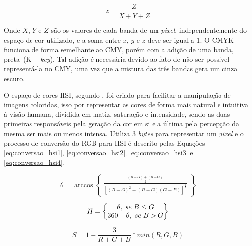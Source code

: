 \documentclass[12pt,oneside,a4paper,chapter=TITLE,section=TITLE,sumario
		=tradicional]{abntex2}
\begin{document}
			\begin{equation}
			\label{eq:normalizacao_cor3}
			z = \frac{Z}{X+Y+Z}
			\end{equation}

		\hspace{-1.3cm}Onde $X$, $Y$ e $Z$ são os valores de cada banda de um \textit{pixel}, independentemente do espaço de cor utilizado, e a soma entre $x$, $y$ e $z$ deve ser igual a $1$. O CMYK funciona de forma semelhante ao CMY, porém com a adição de uma banda, preta~(K~-~\textit{key}). Tal adição é necessária devido ao fato de não ser possível representá-la no CMY, uma vez que a mistura das três bandas gera um cinza escuro.
			
		O espaço de cores HSI, segundo , foi criado para facilitar a manipulação de imagens coloridas, isso por representar as cores de forma mais natural e intuitiva à visão humana, dividida em matiz, saturação e intensidade, sendo as duas primeiras responsáveis pela geração da cor em si e a última pela percepção da mesma ser mais ou menos intensa. Utiliza 3 \textit{bytes} para representar um \textit{pixel} e o processo de conversão do RGB para HSI é descrito pelas Equações \ref{eq:conversao_hsi1}, \ref{eq:conversao_hsi2}, \ref{eq:conversao_hsi3} e \ref{eq:conversao_hsi4}.
			
			\begin{equation}
			\label{eq:conversao_hsi1}
			\theta = \arccos\begin{Bmatrix}\frac{\frac{(R-G)+(R-G)}{2}}{[(R-G)^2 + (R-G)(G-B)]^{\frac{1}{2}}}\end{Bmatrix}
			\end{equation}
			
			\begin{equation}
			\label{eq:conversao_hsi2}
			H = \begin{Bmatrix}\theta,\hspace{0.1cm} se \hspace{0.1cm} B \leq G  \\ 360-\theta,\hspace{0.1cm} se \hspace{0.1cm} B > G \end{Bmatrix}
			\end{equation}
			
			\begin{equation}
			\label{eq:conversao_hsi3}
			S = 1 - \frac{3}{R+G+B} * min(R,G,B)
			\end{equation}
			
\end{document}
